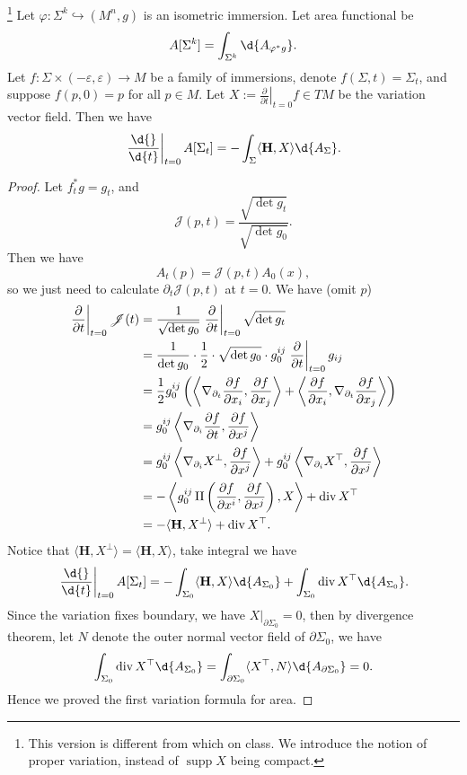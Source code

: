 \begin{prop}
    \footnote{This version is different from which on class. We introduce the notion of proper variation, instead of $\operatorname{supp}X$ being compact.}
    Let $\varphi:\Sigma^k\hookrightarrow(M^n,g)$ is an isometric immersion.
    Let area functional be
    \[A[\Sigma^k]=\int_{\Sigma^k}\d{A_{\varphi^*g}}.\]
    Let $f:\Sigma\times(-\varepsilon,\varepsilon)\to M$ be a family of immersions, denote $f(\Sigma,t)=\Sigma_t$, and suppose $f(p,0)=p$ for all $p\in M$.
    Let $X:=\left.\frac{\partial{}}{\partial{t}}\right|_{t=0}f\in TM$ be the variation vector field.
    Then we have
    \[\left.\frac{\d{}}{\d{t}}\right|_{t=0}A[\Sigma_t]=-\int_\Sigma\langle\mathbf{H},X\rangle\d{A_\Sigma}.\]
\end{prop}
\begin{proof}
    Let $f^*_tg=g_t$, and
    \[\mathscr{J}(p,t)=\frac{\sqrt{\det{g_t}}}{\sqrt{\det{g_0}}}.\]
    Then we have
    \[A_t(p)=\mathscr{J}(p,t)A_0(x),\]
    so we just need to calculate $\partial_t\mathscr{J}(p,t)$ at $t=0$.
    We have (omit $p$)
    \begin{align*}
        \left.\frac{\partial{}}{\partial{t}}\right|_{t=0}\mathscr{J}(t)&=\frac{1}{\sqrt{\det{g_0}}}\left.\frac{\partial}{\partial{t}}\right|_{t=0}\sqrt{\det{g_t}}\\
        &=\frac{1}{\det{g_0}}\cdot\frac{1}{2}\cdot\sqrt{\det{g_0}}\cdot g^{ij}_0\left.\frac{\partial{}}{\partial{t}}\right|_{t=0}g_{ij}\\
        &=\frac{1}{2}g_0^{ij}\left(\left\langle\nabla_{\partial_t}\frac{\partial{f}}{\partial{x_i}},\frac{\partial{f}}{\partial{x_j}}\right\rangle+\left\langle\frac{\partial{f}}{\partial{x_i}},\nabla_{\partial_t}\frac{\partial{f}}{\partial{x_j}}\right\rangle\right)\\
        &=g^{ij}_0\left\langle\nabla_{\partial_i}\frac{\partial{f}}{\partial{t}},\frac{\partial{f}}{\partial{x^j}}\right\rangle\\
        &=g^{ij}_0\left\langle\nabla_{\partial_i}X^\perp,\frac{\partial{f}}{\partial{x^j}}\right\rangle+g^{ij}_0\left\langle\nabla_{\partial_i}X^\top,\frac{\partial{f}}{\partial{x^j}}\right\rangle\\
        &=-\left\langle g^{ij}_0\operatorname{II}\left(\frac{\partial{f}}{\partial{x^i}},\frac{\partial{f}}{\partial{x^j}}\right),X\right\rangle+\mathop{\mathrm{div}}{X^\top}\\
        &=-\langle\mathbf{H},X^\perp\rangle+\mathop{\mathrm{div}}{X^\top}.
    \end{align*}
    Notice that $\langle\mathbf{H},X^\perp\rangle=\langle\mathbf{H},X\rangle$, take integral we have
    \[\left.\frac{\d{}}{\d{t}}\right|_{t=0}A[\Sigma_t]=-\int_{\Sigma_0}\langle\mathbf{H},X\rangle\d{A_{\Sigma_0}}+\int_{\Sigma_0}\div{X^\top}\d{A_{\Sigma_0}}.\]
    Since the variation fixes boundary, we have $X|_{\partial\Sigma_0}=0$, then by divergence theorem, let $N$ denote the outer normal vector field of $\partial\Sigma_0$, we have
    \[\int_{\Sigma_0}\div{X^\top}\d{A_{\Sigma_0}}=\int_{\partial\Sigma_0}\langle X^\top,N\rangle\d{A_{\partial\Sigma_0}}=0.\]
    Hence we proved the first variation formula for area.
\end{proof}

